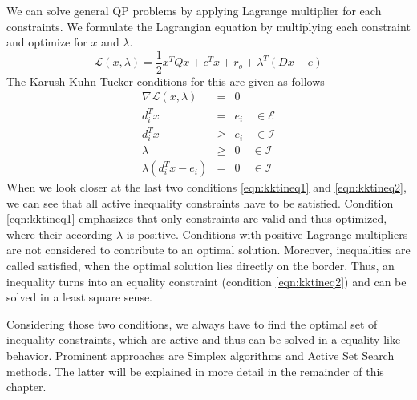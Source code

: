 We can solve general QP problems by applying Lagrange multiplier for each constraints. We formulate the Lagrangian equation by multiplying each constraint and optimize for $x$ and $\lambda$.
\begin{equation}\label{eqn:lagrangian}
\mathcal{L}(x,\lambda) = \frac{1}{2}x^TQx + c^Tx + r_o + \lambda^T (Dx-e)
\end{equation}
The Karush-Kuhn-Tucker conditions \cite{kuhn50nonlinear} for this are given as follows
\begin{eqnarray}
\nabla \mathcal{L}(x, \lambda) &=& 0 \\
d_i^Tx &=& e_i \quad \in \mathcal{E} \\
d_i^Tx &\geq & e_i \quad \in \mathcal{I} \\
\lambda &\geq & 0 \quad \in \mathcal{I} \\ \label{eqn:kktineq1} 
\lambda (d_i^Tx-e_i) &=& 0 \quad \in \mathcal{I} \label{eqn:kktineq2} 
\end{eqnarray}
When we look closer at the last two conditions \ref{eqn:kktineq1} and \ref{eqn:kktineq2}, we can see that all active inequality constraints have to be satisfied. Condition \ref{eqn:kktineq1} emphasizes that only constraints are valid and thus optimized, where their according $\lambda$ is positive. Conditions with positive Lagrange multipliers are not considered to contribute to an optimal solution. Moreover, inequalities are called satisfied, when the optimal solution lies directly on the border. Thus, an inequality turns into an equality constraint (condition \ref{eqn:kktineq2}) and can be solved in a least square sense. 

Considering those two conditions, we always have to find the optimal set of inequality constraints, which are active and thus can be solved in a equality like behavior. Prominent approaches are Simplex algorithms \cite{murty1983linear} and Active Set Search\cite{GVK502988711} methods. The latter will be explained in more detail in the remainder of this chapter. 


